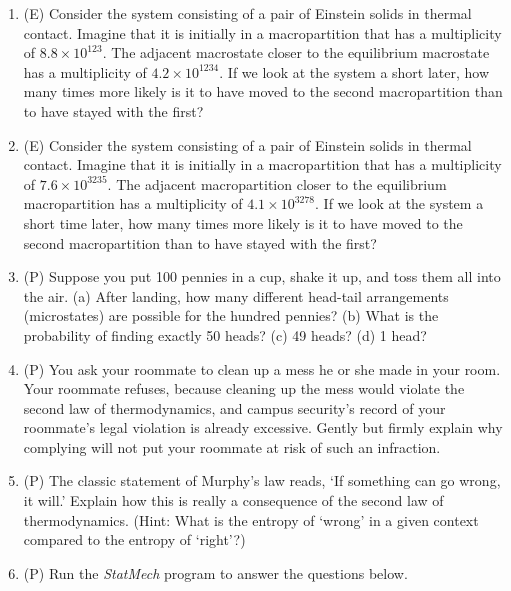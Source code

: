 \begin{enumerate}
\item (E) Consider the system consisting of a pair of Einstein solids in thermal contact.  
Imagine that it is initially in a macropartition that has a multiplicity of $8.8 \times 10^{123}$.  
The adjacent macrostate closer to the equilibrium macrostate has a multiplicity
of $4.2 \times 10^{1234}$.  If we look at the system a 
short later, how many times more likely is it to have moved to the second macropartition 
than to have stayed with the first?

\item (E) Consider the system consisting of a pair of Einstein solids in thermal contact.  
Imagine that it is initially in a macropartition that has a multiplicity of $7.6 \times 10^{3235}$.  
The adjacent macropartition closer to the equilibrium macropartition has a multiplicity 
of $4.1 \times 10^{3278}$.  If we look at the system a short time later, how many times more likely 
is it to have moved to the second macropartition than to have stayed with the first?

\item(P) Suppose you put 100 pennies in a cup, shake it up, and toss them all into the
air.
(a) After landing, how many different head-tail arrangements (microstates) are possible for
the hundred pennies?
(b) What is the probability of finding exactly 50 heads? 
(c) 49 heads?
(d) 1 head?

\item(P) You ask your roommate to clean up a mess he or she made in your room.  Your roommate 
refuses, because cleaning up the mess would violate the second law of thermodynamics, and 
campus security's record of your roommate's legal violation is already excessive.  
Gently but firmly explain why complying will not put your roommate at risk of such an infraction.

\item(P) The classic statement of Murphy's law reads, `If something can go wrong, it will.'   
Explain how this is really a consequence of the second law of thermodynamics.  (Hint:  
What is the entropy of `wrong' in a given context compared to the entropy of `right'?)

\item(P) Run the {\it StatMech} program to answer the questions below.

\begin{enumerate}


\end{enumerate}
\end{enumerate}
